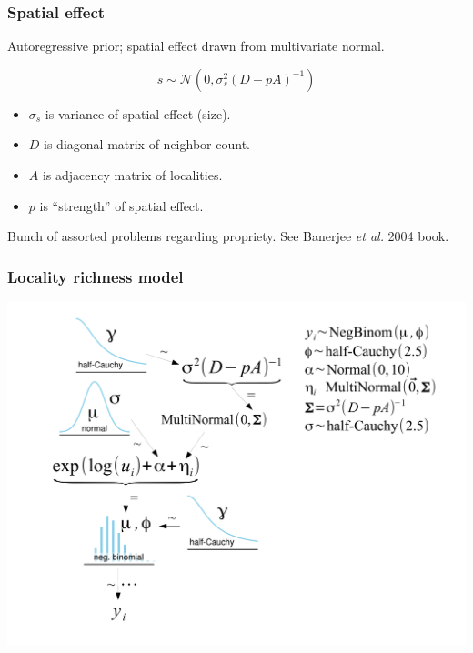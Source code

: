 \documentclass{beamer}
\begin{document}
\begin{frame}
  \frametitle{Spatial effect}

  \begin{definition}
    Autoregressive prior; spatial effect drawn from multivariate normal.

    \begin{equation*}
      s \sim \mathcal{N}(0, \sigma_{s}^{2}(D - pA)^{-1})
    \end{equation*}

    \begin{itemize}
      \item \(\sigma_{s}\) is variance of spatial effect (size).
      \item \(D\) is diagonal matrix of neighbor count.
      \item \(A\) is adjacency matrix of localities.
      \item \(p\) is ``strength'' of spatial effect.
    \end{itemize}

    \tiny{Bunch of assorted problems regarding propriety. See Banerjee \textit{et al.} 2004 book.}

  \end{definition}
\end{frame}

\begin{frame}
  \frametitle{Locality richness model}
  \begin{center}
    \includegraphics[height = 0.8\textheight, width = \textwidth,  keepaspectratio = true]{figure/mammal_locality_model}
  \end{center}
\end{frame}
\end{document}
